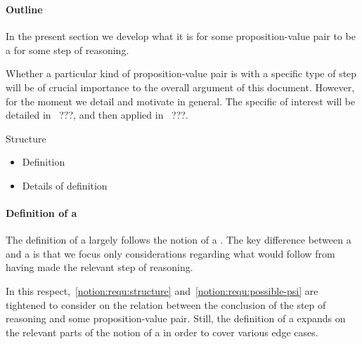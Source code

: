 \subsubsection{}

\paragraph*{Outline}

\begin{note}
  In the present section we develop what it is for some proposition-value pair to be a \crequ{} for some step of reasoning.

  Whether a particular kind of proposition-value pair is \crequ{} with a specific type of step will be of crucial importance to the overall argument of this document.
  However, for the moment we detail and motivate  in general.
  The specific  of interest will be detailed in~{\color{red} ???}, and then applied in~{\color{red} ???}.
\end{note}

\begin{note}
  Structure
  \begin{itemize}
  \item Definition
  \item Details of definition
  \end{itemize}
\end{note}

\paragraph{Definition of a \crequ{}}

\begin{note}
  The definition of a \crequ{} largely follows the notion of a \requ{}.
  The key difference between a \crequ{} and a \requ{} is that we focus only considerations regarding what would follow from having made the relevant step of reasoning.

  In this respect,~\ref{notion:requ:structure} and~\ref{notion:requ:possible-psi} are tightened to consider on the relation between the conclusion of the step of reasoning and some proposition-value pair.
  Still, the definition of a \crequ{} expands on the relevant parts of the notion of a \requ{} in order to cover various edge cases.
\end{note}

